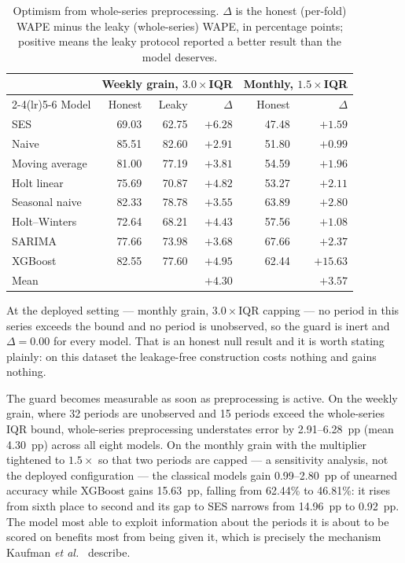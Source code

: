 \documentclass[conference]{IEEEtran}
\begin{document}
\begin{table}[!t]
\caption{Optimism from whole-series preprocessing. $\Delta$ is the honest
(per-fold) WAPE minus the leaky (whole-series) WAPE, in percentage points;
positive means the leaky protocol reported a better result than the model
deserves.}
\label{tab:leakage}
\centering
\footnotesize
\setlength{\tabcolsep}{3pt}
\begin{tabular}{@{}lrrrrr@{}}
\toprule
& \multicolumn{3}{c}{Weekly grain, $3.0\times$IQR} & \multicolumn{2}{c}{Monthly, $1.5\times$IQR} \\
\cmidrule(lr){2-4}\cmidrule(lr){5-6}
Model & Honest & Leaky & $\Delta$ & Honest & $\Delta$ \\
\midrule
SES            & 69.03 & 62.75 & $+6.28$ & 47.48 & $+1.59$ \\
Naive          & 85.51 & 82.60 & $+2.91$ & 51.80 & $+0.99$ \\
Moving average & 81.00 & 77.19 & $+3.81$ & 54.59 & $+1.96$ \\
Holt linear    & 75.69 & 70.87 & $+4.82$ & 53.27 & $+2.11$ \\
Seasonal naive & 82.33 & 78.78 & $+3.55$ & 63.89 & $+2.80$ \\
Holt--Winters  & 72.64 & 68.21 & $+4.43$ & 57.56 & $+1.08$ \\
SARIMA         & 77.66 & 73.98 & $+3.68$ & 67.66 & $+2.37$ \\
XGBoost        & 82.55 & 77.60 & $+4.95$ & 62.44 & $+15.63$ \\
\midrule
Mean           &       &       & $+4.30$ &       & $+3.57$ \\
\bottomrule
\end{tabular}
\end{table}

At the deployed setting --- monthly grain, $3.0\times$IQR capping --- no period
in this series exceeds the bound and no period is unobserved, so the guard is
inert and $\Delta=0.00$ for every model. That is an honest null result and it
is worth stating plainly: on this dataset the leakage-free construction costs
nothing and gains nothing.

The guard becomes measurable as soon as preprocessing is active. On the weekly
grain, where 32 periods are unobserved and 15 periods exceed the whole-series
IQR bound, whole-series preprocessing understates error by 2.91--6.28~pp
(mean 4.30~pp) across all eight models. On the monthly grain with the
multiplier tightened to $1.5\times$ so that two periods are capped --- a
sensitivity analysis, not the deployed configuration --- the classical models
gain 0.99--2.80~pp of unearned accuracy while XGBoost gains 15.63~pp, falling
from 62.44\% to 46.81\%: it rises from sixth place to second and its gap to
SES narrows from 14.96~pp to 0.92~pp. The model most able to exploit
information about the periods it is about to be scored on benefits most from
being given it, which is precisely the mechanism Kaufman
\emph{et al.}~\cite{kaufman2012leakage} describe.
\end{document}
